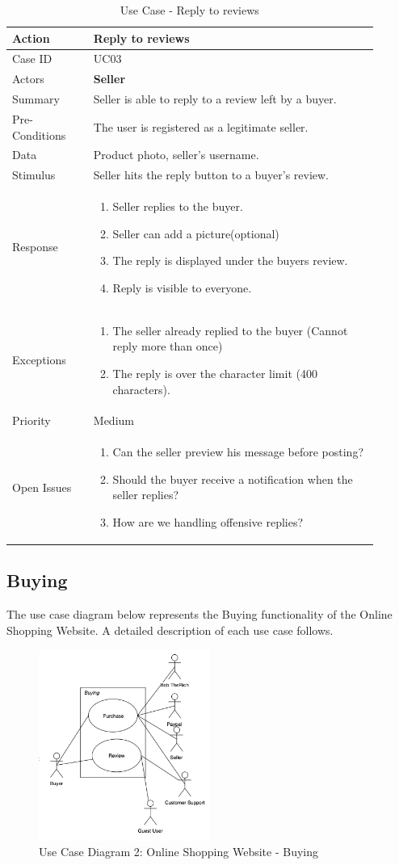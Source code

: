 \documentclass[11pt]{article}
\newcounter{use case ID}
\newcommand\tabularhead[1]{
    \begin{table}[ht]
        \addtocounter{use case ID}{1}
        \caption{Use Case \arabic{use case ID} - #1}
        \vspace{0.2cm}
        \begin{tabular}{|p{0.2\linewidth}|p{0.70\linewidth}|}
            \hline
            \textbf{Action} & \textbf{#1} \\
            \hline}
\newcommand\addrow[2]{#1 & #2\\ \hline}
\newcommand\addmulrow[2]{ \begin{minipage}[t][][t]{2.5cm}#1\end{minipage}
                &\begin{minipage}[t][][t]{11cm}
                    \begin{enumerate}[itemsep=-1ex] #2   \end{enumerate}
                \end{minipage}\vfill\\ \hline}
\newenvironment{usecase}{\tabularhead}
        {\hline\end{tabular}\end{table}}
\begin{document}
\begin{usecase}{Reply to reviews}
    \addrow{Case ID}{UC03}
    \addrow{Actors}{\textbf{Seller}}
    \addrow{Summary}{\index{seller}Seller is able to reply to a review left by a buyer.}
    \addrow{Pre-Conditions}{The user is registered as a legitimate seller. }
    \addrow{\index{data}Data}{Product photo, seller's username.}
    \addrow{Stimulus}{Seller hits the reply button to a buyer's review.}
    \addmulrow{Response}{
            \item Seller replies to the buyer.
            \item Seller can add a picture(optional)
            \item The reply is displayed under the buyers review.
            \item Reply is visible to everyone.
    }
    \addmulrow{Exceptions}{
            \item The seller already replied to the buyer (Cannot reply more than once)
            \item The reply is over the character limit (400 characters).
    }
    \addrow{Priority}{Medium}
    \addmulrow{Open Issues}{
        \item Can the seller preview his message before posting? 
        \item Should the buyer receive a notification when the seller replies? 
        \item How are we handling offensive replies?
    }
\end{usecase}

\clearpage

\subsection{Buying}

The use case diagram below represents the Buying functionality of the Online Shopping Website. A detailed description of each use case follows.

\begin{figure}[htbp]
    \centering
    \includegraphics[width=0.5\textwidth]{Diagrams/Use_Case/ucd2.png}
    \caption{Use Case Diagram 2: Online Shopping Website - Buying }
    \label{fig:ucd2}
\end{figure}
\end{document}
